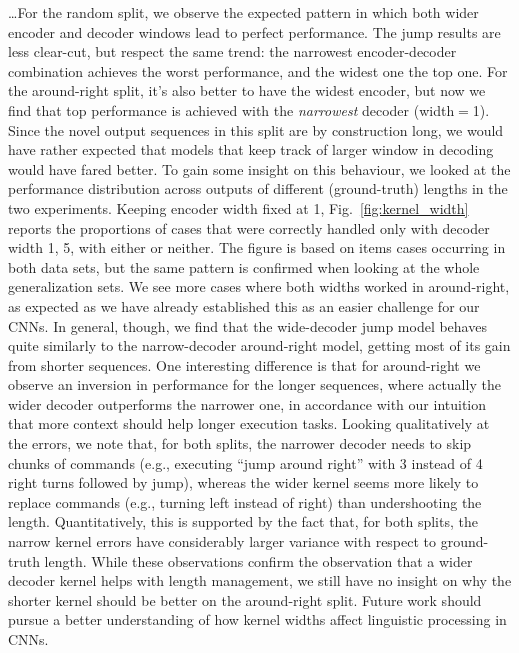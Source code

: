 \ldots For the random split, we observe the expected pattern in which
both wider encoder and decoder windows lead to perfect
performance. The jump results are less clear-cut, but respect the same
trend: the narrowest encoder-decoder combination achieves the worst
performance, and the widest one the top one. For the around-right
split, it's also better to have the widest encoder, but now we find
that top performance is achieved with the \emph{narrowest} decoder
(width$=$1). Since the novel output sequences in this split are by
construction long, we would have rather expected that models that keep
track of larger window in decoding would have fared better. To gain
some insight on this behaviour, we looked at the performance
distribution across outputs of different (ground-truth) lengths in the
two experiments. Keeping encoder width fixed at 1,
Fig.~\ref{fig:kernel_width} reports the proportions of cases that were
correctly handled only with decoder width 1, 5, with either or
neither. The figure is based on items cases occurring in both data
sets, but the same pattern is confirmed when looking at the whole
generalization sets. We see more cases where both widths worked in
around-right, as expected as we have already established this as an
easier challenge for our CNNs. In general, though, we find that the
wide-decoder jump model behaves quite similarly to the narrow-decoder
around-right model, getting most of its gain from shorter
sequences. One interesting difference is that for around-right we
observe an inversion in performance for the longer sequences, where
actually the wider decoder outperforms the narrower one, in accordance
with our intuition that more context should help longer execution
tasks. Looking qualitatively at the errors, we note that, for both
splits, the narrower decoder needs to skip chunks of commands (e.g.,
executing ``jump around right'' with 3 instead of 4 right turns
followed by jump), whereas the wider kernel seems more likely to
replace commands (e.g., turning left instead of right) than
undershooting the length. Quantitatively, this is supported by the
fact that, for both splits, the narrow kernel errors have considerably
larger variance with respect to ground-truth length. While these
observations confirm the observation that a wider decoder kernel helps
with length management, we still have no insight on why the shorter
kernel should be better on the around-right split. Future work should
pursue a better understanding of how kernel widths affect linguistic
processing in CNNs.

